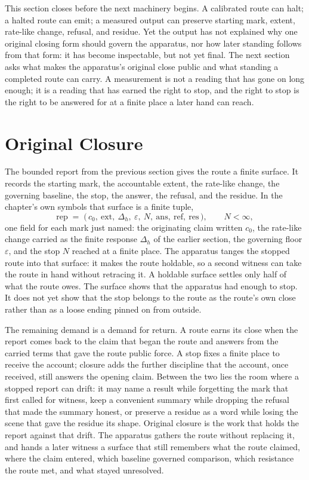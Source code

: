 This section closes before the next machinery begins. A calibrated route can halt; a halted route can emit; a measured output can preserve starting mark, extent, rate-like change, refusal, and residue. Yet the output has not explained why one original closing form should govern the apparatus, nor how later standing follows from that form: it has become inspectable, but not yet final. The next section asks what makes the apparatus's original close public and what standing a completed route can carry. A measurement is not a reading that has gone on long enough; it is a reading that has earned the right to stop, and the right to stop is the right to be answered for at a finite place a later hand can reach.

\section{Original Closure}

The bounded report from the previous section gives the route a finite surface.
It records the starting mark, the accountable extent, the rate-like change, the
governing baseline, the stop, the answer, the refusal, and the residue. In the chapter's own symbols that surface is a finite tuple,
\[ \mathrm{rep} \;=\; \big(\, c_0,\ \mathrm{ext},\ \Delta_h,\ \varepsilon,\ N,\ \mathrm{ans},\ \mathrm{ref},\ \mathrm{res} \,\big), \qquad N < \infty, \]
one field for each mark just named: the originating claim written $c_0$, the rate-like change carried as the finite response $\Delta_h$ of the earlier section, the governing floor $\varepsilon$, and the stop $N$ reached at a finite place. The
apparatus tanges the stopped route into that surface: it makes the route
holdable, so a second witness can take the route in hand without retracing it.
A holdable surface settles only half of what the route owes. The surface shows
that the apparatus had enough to stop. It does not yet show that the stop
belongs to the route as the route's own close rather than as a loose ending
pinned on from outside.

The remaining demand is a demand for return. A route earns its close when the
report comes back to the claim that began the route and answers from the carried
terms that gave the route public force. A stop fixes a finite place to receive
the account; closure adds the further discipline that the account, once
received, still answers the opening claim. Between the two lies the room where a
stopped report can drift: it may name a result while forgetting the mark that
first called for witness, keep a convenient summary while dropping the refusal
that made the summary honest, or preserve a residue as a word while losing the
scene that gave the residue its shape. Original closure is the work that holds
the report against that drift. The apparatus gathers the route without replacing
it, and hands a later witness a surface that still remembers what the route
claimed, where the claim entered, which baseline governed comparison, which
resistance the route met, and what stayed unresolved.

